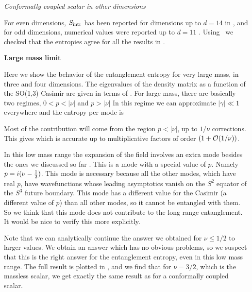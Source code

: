 {\it Conformally coupled scalar in other dimensions}

For even dimensions, $S_{\rm intr}$ has been reported for dimensions up to $d=14$ in \CasiniKT , and for odd dimensions, numerical values were reported up to $d=11$ \Entsph. Using \entanglr\ we checked that the entropies agree for all the results in .

{\bf  Large mass limit}

Here we show the behavior of the entanglement entropy for very large mass, in three and four dimensions. The eigenvalues of the density matrix
 as a function of the SO(1,3) Casimir are given in terms of  \eigen . For large mass, there are basically two regimes, $0<p < |\nu|$ and $p>|\nu|$
\eqn{}
In this regime we can approximate $|\gamma|\ll 1 $ everywhere and the entropy per mode is
\eqn{}

Most of the contribution will come from the region $p< |\nu|$, up to $1/\nu$ corrections.
 This gives
\eqn{}
which is accurate up to multiplicative factors of order $ (1 + {\cal O}(1/\nu ) )$.


In this low mass range the expansion of the field involves an extra mode besides the ones we discussed so far \SasakiYT.
This is a mode with a special value of $p$. Namely $p = i (\nu - {1\over 2 } ) $. This mode is necessary because all the other modes, which have real $p$,  have
wavefunctions whose leading asymptotics vanish on the $S^2$ equator of the $S^3$ future boundary.
This mode has a different value for the Casimir (a different value of $p$) 
 than all other modes, so it cannot be entangled with them.
So we think  that this mode does not contribute to the  long range entanglement. It would be
nice to verify this more explicitly. 

Note that 
 we can analytically continue the answer we obtained for $\nu\leq 1/2$ to larger values. We obtain an answer which has
no obvious problems, so we suspect that this is the right answer for the entanglement entropy, even in this low mass range.
The full result is plotted in  \entrfree , and we find that for $\nu =3/2$, which is the massless scalar, we get exactly the same
result as for a conformally coupled scalar.



